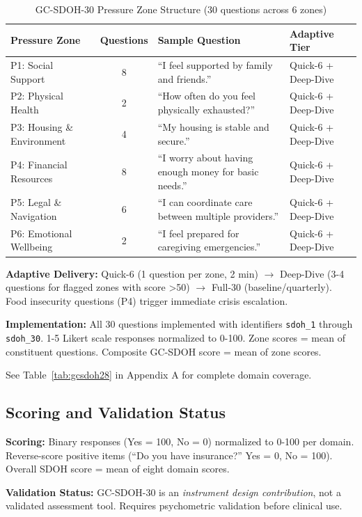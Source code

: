 \documentclass{article}
\begin{document}
\begin{table}[htbp]
\centering
\caption{GC-SDOH-30 Pressure Zone Structure (30 questions across 6 zones)}
\label{table:sdoh_domains}
\small
\begin{tabular}{p{3.5cm}cp{5cm}p{2.5cm}}
\toprule
\textbf{Pressure Zone} & \textbf{Questions} & \textbf{Sample Question} & \textbf{Adaptive Tier} \\
\midrule
P1: Social Support & 8 & ``I feel supported by family and friends.'' & Quick-6 + Deep-Dive \\
P2: Physical Health & 2 & ``How often do you feel physically exhausted?'' & Quick-6 + Deep-Dive \\
P3: Housing \& Environment & 4 & ``My housing is stable and secure.'' & Quick-6 + Deep-Dive \\
P4: Financial Resources & 8 & ``I worry about having enough money for basic needs.'' & Quick-6 + Deep-Dive \\
P5: Legal \& Navigation & 6 & ``I can coordinate care between multiple providers.'' & Quick-6 + Deep-Dive \\
P6: Emotional Wellbeing & 2 & ``I feel prepared for caregiving emergencies.'' & Quick-6 + Deep-Dive \\
\bottomrule
\end{tabular}
\end{table}
\textbf{Adaptive Delivery:} Quick-6 (1 question per zone, 2 min) $\rightarrow$ Deep-Dive (3-4 questions for flagged zones with score >50) $\rightarrow$ Full-30 (baseline/quarterly). Food insecurity questions (P4) trigger immediate crisis escalation.

\textbf{Implementation:} All 30 questions implemented with identifiers \texttt{sdoh\_1} through \texttt{sdoh\_30}. 1-5 Likert scale responses normalized to 0-100. Zone scores = mean of constituent questions. Composite GC-SDOH score = mean of zone scores.

See Table~\ref{tab:gcsdoh28} in Appendix A for complete domain coverage.

%
%
\subsection{Scoring and Validation Status}%
\label{subsec:ScoringandConvergentValidity}%
\textbf{Scoring:} Binary responses (Yes = 100, No = 0) normalized to 0-100 per domain. Reverse-score positive items (``Do you have insurance?'' Yes = 0, No = 100). Overall SDOH score = mean of eight domain scores.

\textbf{Validation Status:} GC-SDOH-30 is an \textit{instrument design contribution}, not a validated assessment tool. Requires psychometric validation before clinical use.
\end{document}
